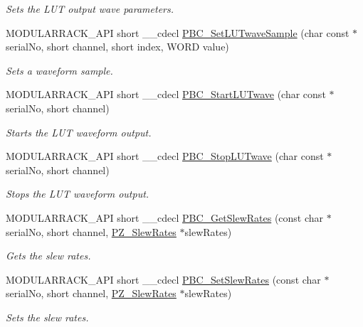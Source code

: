 \begin{DoxyCompactItemize}
\begin{DoxyCompactList}\small\item\em Sets the L\+UT output wave parameters. \end{DoxyCompactList}\item 
M\+O\+D\+U\+L\+A\+R\+R\+A\+C\+K\+\_\+\+A\+PI short \+\_\+\+\_\+cdecl \hyperlink{group___modular_piezo_gac3d6497289aa40737355531a5f5b0b9d}{P\+B\+C\+\_\+\+Set\+L\+U\+Twave\+Sample} (char const $\ast$serial\+No, short channel, short index, W\+O\+RD value)
\begin{DoxyCompactList}\small\item\em Sets a waveform sample. \end{DoxyCompactList}\item 
M\+O\+D\+U\+L\+A\+R\+R\+A\+C\+K\+\_\+\+A\+PI short \+\_\+\+\_\+cdecl \hyperlink{group___modular_piezo_gad2d9092648bc2c17a3d2c8c451a36588}{P\+B\+C\+\_\+\+Start\+L\+U\+Twave} (char const $\ast$serial\+No, short channel)
\begin{DoxyCompactList}\small\item\em Starts the L\+UT waveform output. \end{DoxyCompactList}\item 
M\+O\+D\+U\+L\+A\+R\+R\+A\+C\+K\+\_\+\+A\+PI short \+\_\+\+\_\+cdecl \hyperlink{group___modular_piezo_gaa524a9911bcaa89b5ec24f480caa7bb8}{P\+B\+C\+\_\+\+Stop\+L\+U\+Twave} (char const $\ast$serial\+No, short channel)
\begin{DoxyCompactList}\small\item\em Stops the L\+UT waveform output. \end{DoxyCompactList}\item 
M\+O\+D\+U\+L\+A\+R\+R\+A\+C\+K\+\_\+\+A\+PI short \+\_\+\+\_\+cdecl \hyperlink{group___modular_piezo_gadfe785bcf9e38a65ce7dd56a1fae1102}{P\+B\+C\+\_\+\+Get\+Slew\+Rates} (const char $\ast$serial\+No, short channel, \hyperlink{struct_p_z___slew_rates}{P\+Z\+\_\+\+Slew\+Rates} $\ast$slew\+Rates)
\begin{DoxyCompactList}\small\item\em Gets the slew rates. \end{DoxyCompactList}\item 
M\+O\+D\+U\+L\+A\+R\+R\+A\+C\+K\+\_\+\+A\+PI short \+\_\+\+\_\+cdecl \hyperlink{group___modular_piezo_gac737aa06bc1a675ce5d721c14fbd5439}{P\+B\+C\+\_\+\+Set\+Slew\+Rates} (const char $\ast$serial\+No, short channel, \hyperlink{struct_p_z___slew_rates}{P\+Z\+\_\+\+Slew\+Rates} $\ast$slew\+Rates)
\begin{DoxyCompactList}\small\item\em Sets the slew rates. \end{DoxyCompactList}\end{DoxyCompactItemize}


